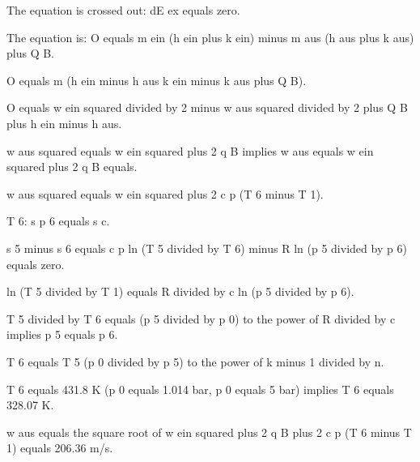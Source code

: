 The equation is crossed out: dE ex equals zero.

The equation is: O equals m ein (h ein plus k ein) minus m aus (h aus plus k aus) plus Q B.

O equals m (h ein minus h aus k ein minus k aus plus Q B).

O equals w ein squared divided by 2 minus w aus squared divided by 2 plus Q B plus h ein minus h aus.

w aus squared equals w ein squared plus 2 q B implies w aus equals w ein squared plus 2 q B equals.

w aus squared equals w ein squared plus 2 c p (T 6 minus T 1).

T 6: s p 6 equals s c.

s 5 minus s 6 equals c p ln (T 5 divided by T 6) minus R ln (p 5 divided by p 6) equals zero.

ln (T 5 divided by T 1) equals R divided by c ln (p 5 divided by p 6).

T 5 divided by T 6 equals (p 5 divided by p 0) to the power of R divided by c implies p 5 equals p 6.

T 6 equals T 5 (p 0 divided by p 5) to the power of k minus 1 divided by n.

T 6 equals 431.8 K (p 0 equals 1.014 bar, p 0 equals 5 bar) implies T 6 equals 328.07 K.

w aus equals the square root of w ein squared plus 2 q B plus 2 c p (T 6 minus T 1) equals 206.36 m/s.